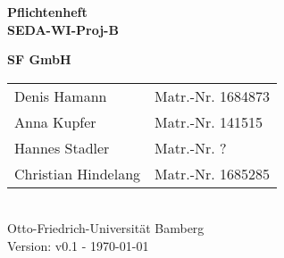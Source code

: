 \documentclass[pdftex, a4paper, 12pt]{article}
\begin{document}


\begin{titlepage}

{\sffamily
\vspace*{2cm}
\begin{center}
	\bfseries
	\LARGE {Pflichtenheft\\SEDA-WI-Proj-B}
\end{center}
\vspace{1cm}
\begin{center}

	{\Large\bfseries SF GmbH\\[5mm]}

	\begin{tabular}{ll}
		Denis Hamann & Matr.-Nr. 1684873 \\[3mm]

		Anna Kupfer & Matr.-Nr.  141515\\[3mm]

		Hannes Stadler & Matr.-Nr. ? \\[3mm]

		Christian Hindelang & Matr.-Nr. 1685285 \\[3mm]


	\end{tabular}\\[0.5cm]
	
{\scriptsize Otto-Friedrich-Universität Bamberg} \\[21pt]


{\footnotesize Version: v0.1 - \today }



\end{center}
}
\end{titlepage}


\newpage

\textcolor{MidnightBlue}{\tableofcontents}

\textcolor{MidnightBlue}{\listoffigures}

\newpage

\newpage

\newpage

\newpage

\newpage

\newpage

\newpage

\newpage

\newpage

\newpage

\newpage

\newpage

\newpage 
%
\end{document}
